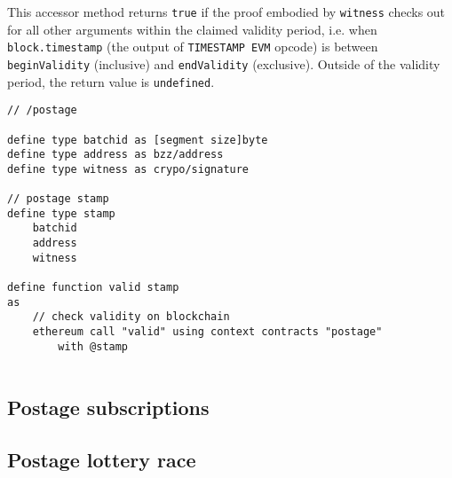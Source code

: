 This accessor method returns \lstinline{true} if the proof embodied by \lstinline{witness} checks out for all other arguments within the claimed 
validity period, i.e. when \lstinline{block.timestamp} (the output of \lstinline{TIMESTAMP EVM} opcode) is between \lstinline{beginValidity} (inclusive) and 
\lstinline{endValidity} (exclusive). Outside of the validity period, the return value is \lstinline{undefined}.
 

\begin{definition}\label{def:postage-stamp}
\begin{lstlisting}[language=buzz1]
// /postage

define type batchid as [segment size]byte  
define type address as bzz/address
define type witness as crypo/signature

// postage stamp
define type stamp  
    batchid
    address
    witness

define function valid stamp
as 
    // check validity on blockchain
    ethereum call "valid" using context contracts "postage"
        with @stamp
        
\end{lstlisting}
\end{definition}

\subsection{Postage subscriptions}\label{spec:format:subscriptions}

\subsection{Postage lottery race}\label{spec:format:race}